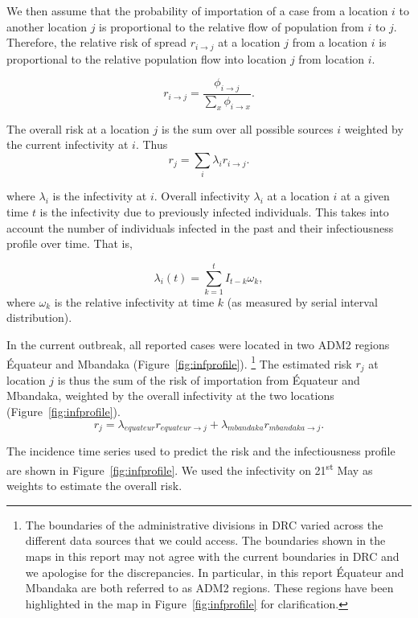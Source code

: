 \documentclass[11pt,]{article}
\begin{document}
We then assume that the probability of importation of a case from a location \(i\) to another location \(j\) is
proportional to the relative flow of population from \(i\) to \(j\).
Therefore, the relative risk of spread \(r_{i \rightarrow j}\)
at a location \(j\) from a location \(i\)
is proportional to the relative population flow into location \(j\) from location \(i\).

\[
  r_{i \rightarrow j} = \frac{\phi_{i \rightarrow
  j}}{\sum_{x}{\phi_{i \rightarrow
  x}}}.
\]

\FloatBarrier



The overall risk at a location \( j \) is the 
sum over all possible sources \( i \) weighted by the current
infectivity at \(i\). Thus
\[ r_j = \sum_{i}{\lambda_i r_{i \rightarrow j}}.\]

where \(\lambda_i\) is the infectivity at \(i\).
Overall infectivity \( \lambda_i \) at a location \(i\) at a given time
\(t\) is the infectivity due to previously infected individuals.
This takes into account the number of individuals infected in the past and their infectiousness profile over time. That is,

\[ \lambda_i(t) = \sum_{k = 1}^{t}{I_{t - k} \omega_k},\]
where \( \omega_k \) is the relative infectivity at time \( k \) (as measured by serial interval distribution).


In the current outbreak, all reported cases were located in two ADM2 regions 
Équateur and Mbandaka (Figure~\ref{fig:infprofile}).
\footnote{The boundaries of the administrative divisions in DRC varied
  across the different data sources that we could access. The
  boundaries shown in the maps in this report may not agree with the
  current boundaries in DRC and we apologise for the discrepancies.
  In particular, in this report Équateur and Mbandaka are both
  referred to as ADM2 regions. These regions have been highlighted in the map
  in Figure~\ref{fig:infprofile} for clarification.  
}
The estimated risk \(r_j\) at location \(j\) is thus the sum of
the risk of importation from Équateur and Mbandaka, weighted by the
overall infectivity at the two locations (Figure~\ref{fig:infprofile}).  
\[
  r_j = \lambda_{equateur} r_{equateur \rightarrow j} +
  \lambda_{mbandaka} r_{mbandaka \rightarrow j}. 
\]


The incidence time series used to predict the risk and
the infectiousness profile are shown in Figure~\ref{fig:infprofile}.
We used the infectivity on 21\textsuperscript{st} May as weights to
estimate the overall risk.
\end{document}
